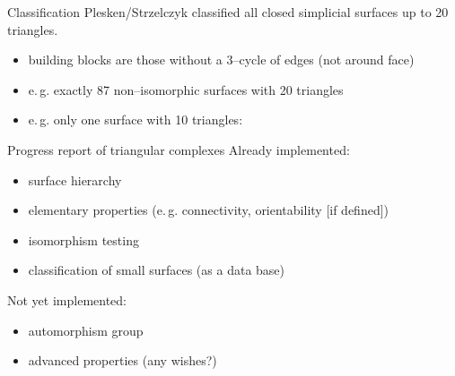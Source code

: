 \begin{frame}{Classification}
    \pause
    Plesken/Strzelczyk classified all closed simplicial surfaces up to 20 triangles.

    \begin{itemize}
        \pause
        \item building blocks are those without a 3--cycle of edges (not around face)
        \pause
        \item e.\,g. exactly 87 non--isomorphic surfaces with 20 triangles
        \pause
        \item e.\,g. only one surface with 10 triangles:
    \end{itemize}

    \pause
    \begin{center}
    \end{center}
\end{frame}


\begin{frame}{Progress report of triangular complexes}
    \pause
    Already implemented:
    \begin{itemize}
        \pause
        \item surface hierarchy
        \pause
        \item elementary properties (e.\,g. connectivity, orientability [if defined])
        \pause
        \item isomorphism testing
        \pause
        \item classification of small surfaces (as a data base)
    \end{itemize}

    \pause
    Not yet implemented:
    \begin{itemize}
        \pause
        \item automorphism group
        \pause
        \item advanced properties (any wishes?)
    \end{itemize}
\end{frame}
